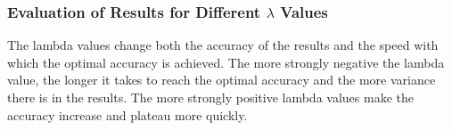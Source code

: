 \documentclass[letterpaper,10pt]{article}
\begin{document}
\subsubsection{Evaluation of Results for Different \(\lambda\) Values}
The lambda values change both the accuracy of the results and the speed with which the optimal 
accuracy is achieved. The more strongly negative the lambda value, the longer it takes to reach the 
optimal accuracy and the more variance there is in the results. The more strongly positive lambda values make the accuracy increase and plateau more quickly.
\end{document}
